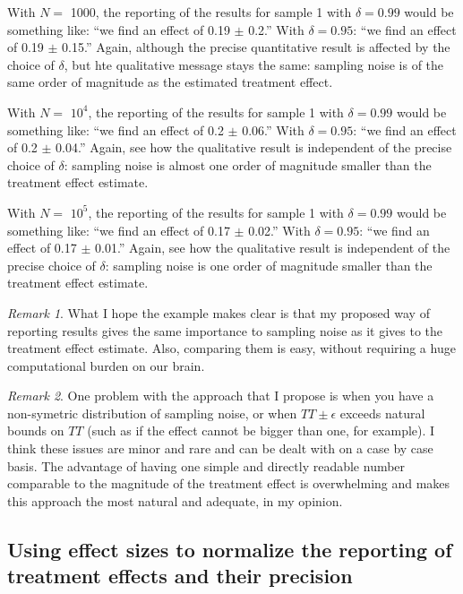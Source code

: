 \documentclass[
]{book}
\theoremstyle{definition}
\theoremstyle{definition}
\theoremstyle{definition}
\theoremstyle{definition}
\theoremstyle{remark}
\newtheorem*{remark}{Remark}
\begin{document}
With \(N=\) 1000, the reporting of the results for sample 1 with \(\delta=0.99\) would be something like: ``we find an effect of 0.19 \(\pm\) 0.2.''
With \(\delta=0.95\): ``we find an effect of 0.19 \(\pm\) 0.15.''
Again, although the precise quantitative result is affected by the choice of \(\delta\), but hte qualitative message stays the same: sampling noise is of the same order of magnitude as the estimated treatment effect.

With \(N=\) \ensuremath{10^{4}}, the reporting of the results for sample 1 with \(\delta=0.99\) would be something like: ``we find an effect of 0.2 \(\pm\) 0.06.''
With \(\delta=0.95\): ``we find an effect of 0.2 \(\pm\) 0.04.''
Again, see how the qualitative result is independent of the precise choice of \(\delta\): sampling noise is almost one order of magnitude smaller than the treatment effect estimate.

With \(N=\) \ensuremath{10^{5}}, the reporting of the results for sample 1 with \(\delta=0.99\) would be something like: ``we find an effect of 0.17 \(\pm\) 0.02.''
With \(\delta=0.95\): ``we find an effect of 0.17 \(\pm\) 0.01.''
Again, see how the qualitative result is independent of the precise choice of \(\delta\): sampling noise is one order of magnitude smaller than the treatment effect estimate.

\begin{remark}
\iffalse{} {Remark. } \fi{}What I hope the example makes clear is that my proposed way of reporting results gives the same importance to sampling noise as it gives to the treatment effect estimate.
Also, comparing them is easy, without requiring a huge computational burden on our brain.
\end{remark}

\begin{remark}
\iffalse{} {Remark. } \fi{}One problem with the approach that I propose is when you have a non-symetric distribution of sampling noise, or when \(TT \pm \epsilon\) exceeds natural bounds on \(TT\) (such as if the effect cannot be bigger than one, for example).
I think these issues are minor and rare and can be dealt with on a case by case basis.
The advantage of having one simple and directly readable number comparable to the magnitude of the treatment effect is overwhelming and makes this approach the most natural and adequate, in my opinion.
\end{remark}

\hypertarget{sec:effectsize}{%
\subsection{Using effect sizes to normalize the reporting of treatment effects and their precision}\label{sec:effectsize}}
\end{document}

